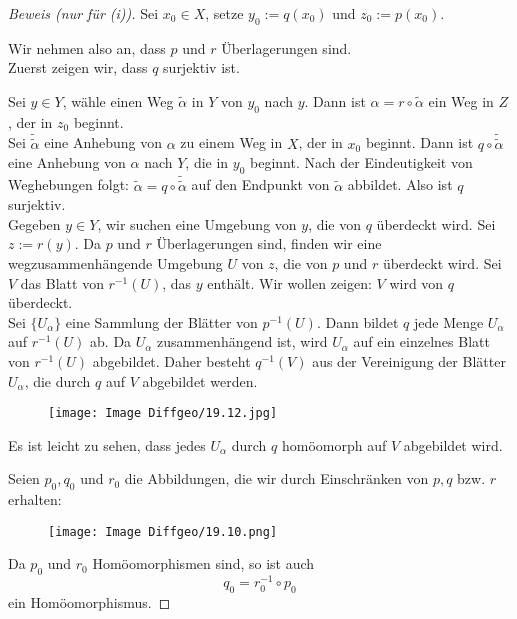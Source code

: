\documentclass[fleqn, 12pt, letterpaper]{article}
\begin{document}
\begin{proof}[Beweis (nur für (i))] 
Sei \( x_0 \in X \), setze \( y_0 := q(x_0) \) und \( z_0 := p(x_0) \).

Wir nehmen also an, dass \( p \) und \( r \) Überlagerungen sind.\\

Zuerst zeigen wir, dass \( q \) surjektiv ist.

Sei \( y \in Y \), wähle einen Weg \( \tilde{\alpha} \) in \( Y \) von \( y_0 \) nach \( y \). Dann ist \( \alpha=r \circ  \tilde{\alpha} \) ein Weg in \( Z \), der in \( z_0 \) beginnt.\\

Sei \( \tilde{ \tilde{\alpha}} \) eine Anhebung von \( \alpha\) zu einem Weg in \( X \), der in \( x_0 \) beginnt.
Dann ist \( q \circ  \tilde{\tilde{\alpha}} \) eine Anhebung von \( \alpha \) nach \( Y \), die in \( y_0 \) beginnt. Nach der Eindeutigkeit von Weghebungen folgt: \( \widetilde{\alpha}=q\circ\tilde{ \tilde{\alpha}} \) auf den Endpunkt von \( \tilde{\alpha} \) abbildet. Also ist $q$ surjektiv.\\

Gegeben \( y \in Y \), wir suchen eine Umgebung von \( y \), die von \( q \) überdeckt wird.  
Sei \( z := r(y) \). Da \( p \) und \( r \) Überlagerungen sind, finden wir eine wegzusammenhängende Umgebung \( U \) von \( z \), die von \( p \) und \( r \) überdeckt wird. Sei \( V \) das Blatt von \( r^{-1}(U) \), das \( y \) enthält.  
Wir wollen zeigen: \( V \) wird von \( q \) überdeckt.  \\

Sei \( \{ U_\alpha \} \) eine Sammlung der Blätter von \( p^{-1}(U) \). Dann bildet \( q \) jede Menge \( U_\alpha \) auf \( r^{-1}(U) \) ab.  
Da \( U_\alpha \) zusammenhängend ist, wird \( U_\alpha \) auf ein einzelnes Blatt von \( r^{-1}(U) \) abgebildet.  
Daher besteht \( q^{-1}(V) \) aus der Vereinigung der Blätter \( U_\alpha \), die durch \( q \) auf \( V \) abgebildet werden.

  \begin{figure}[H]
    \centering
    \texttt{[image: Image Diffgeo/19.12.jpg]}
 \end{figure}

Es ist leicht zu sehen, dass jedes \( U_\alpha \) durch \( q \) homöomorph auf \( V \) abgebildet wird.

Seien \( p_0, q_0 \) und \( r_0 \) die Abbildungen, die wir durch Einschränken von \( p, q \) bzw. \( r \) erhalten:

  \begin{figure}[H]
    \centering
    \texttt{[image: Image Diffgeo/19.10.png]}
 \end{figure}

Da \( p_0 \) und \( r_0 \) Homöomorphismen sind, so ist auch
\[
q_0 = r_0^{-1} \circ p_0
\]
ein Homöomorphismus.

\end{proof}
\end{document}
